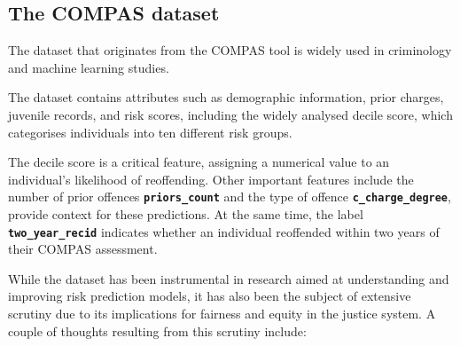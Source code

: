 \subsection{The COMPAS dataset}

The dataset that originates from the COMPAS tool is widely used in criminology and machine learning studies. 

The dataset contains attributes such as demographic information, prior charges, juvenile records, and risk scores, including the widely analysed decile score, which categorises individuals into ten different risk groups. 

The decile score is a critical feature, assigning a numerical value to an individual's likelihood of reoffending. Other important features include the number of prior offences \textbf{\texttt{priors\_count}} and the type of offence \textbf{\texttt{c\_charge\_degree}}, provide context for these predictions. At the same time, the label \textbf{\texttt{two\_year\_recid}} indicates whether an individual reoffended within two years of their COMPAS assessment.

While the dataset has been instrumental in research aimed at understanding and improving risk prediction models, it has also been the subject of extensive scrutiny due to its implications for fairness and equity in the justice system. A couple of thoughts resulting from this scrutiny include:


